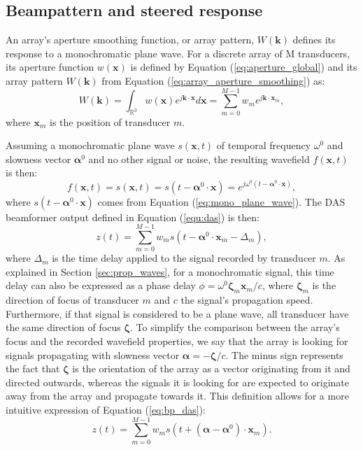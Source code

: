 \subsection{Beampattern and steered response}
\label{sec:beampattern} 
An array's aperture smoothing function, or array pattern, $W(\boldsymbol{k})$ defines its response to a monochromatic plane wave.
For a discrete array of M transducers, its aperture function $w(\boldsymbol{x})$ is defined by Equation (\ref{eq:aperture_global}) and its array pattern $W(\boldsymbol{k})$ from Equation (\ref{eq:array_aperture_smoothing}) as:
\begin{equation}
    W(\boldsymbol{k}) = \int_{\mathbb{R}^3} w(\boldsymbol{x}) e^{j \boldsymbol{k} \cdot \boldsymbol{x}} d\boldsymbol{x} = \sum_{m=0}^{M-1} w_m e^{j \boldsymbol{k} \cdot \boldsymbol{x}_m}, 
\label{eq:bp_aas}
\end{equation}
\noindent
where $\boldsymbol{x}_m$ is the position of transducer $m$.

Assuming a monochromatic plane wave $s(\boldsymbol{x},t)$ of temporal frequency $\omega^0$ and slowness vector $\boldsymbol{\alpha}^0$ and no other signal or noise, the resulting wavefield $f(\boldsymbol{x},t)$ is then:
\begin{equation}
    f(\boldsymbol{x},t) =  s(\boldsymbol{x},t) = s(t - \boldsymbol{\alpha}^0 \cdot \boldsymbol{x}) = e^{j \omega^0 (t - \boldsymbol{\alpha}^0 \cdot \boldsymbol{x})},
\label{eq:bp_mono}
\end{equation}
\noindent
where $s(t - \boldsymbol{\alpha}^0 \cdot \boldsymbol{x})$ comes from Equation (\ref{eq:mono_plane_wave}).
The DAS beamformer output defined in Equation (\ref{equ:das}) is then:
\begin{equation}
    z(t) = \sum_{m=0}^{M-1} w_m s(t - \boldsymbol{\alpha}^0 \cdot \boldsymbol{x}_m - \Delta_m),
\label{eq:bp_das}
\end{equation}
\noindent
where $\Delta_m$ is the time delay applied to the signal recorded by transducer $m$.
As explained in Section \ref{sec:prop_waves}, for a monochromatic signal, this time delay can also be expressed as a phase delay $\phi = \omega^0 \boldsymbol{\zeta}_m \boldsymbol{x}_m / c$, where $\boldsymbol{\zeta}_m$ is the direction of focus of transducer $m$ and $c$ the signal's propagation speed.
Furthermore, if that signal is considered to be a plane wave, all transducer have the same direction of focus $\boldsymbol{\zeta}$.
To simplify the comparison between the array's focus and the recorded wavefield properties, we say that the array is looking for signals propagating with slowness vector $\boldsymbol{\alpha} = -\boldsymbol{\zeta}/c$. The minus sign represents the fact that $\boldsymbol{\zeta}$ is the orientation of the array as a vector originating from it and directed outwards, whereas the signals it is looking for are expected to originate away from the array and propagate towards it.
This definition allows for a more intuitive expression of Equation (\ref{eq:bp_das}):
\begin{equation}
    z(t) = \sum_{m=0}^{M-1} w_m s(t + (\boldsymbol{\alpha} - \boldsymbol{\alpha}^0) \cdot \boldsymbol{x}_m).
\label{eq:bp_das_alpha}
\end{equation}

